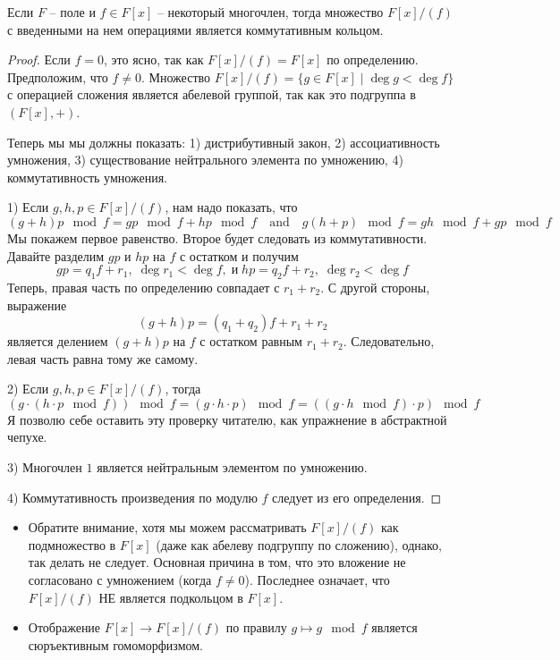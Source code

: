 \begin{claim}
Если $F$ -- поле и $f\in F[x]$ -- некоторый многочлен, тогда множество $F[x]/(f)$ с введенными на нем операциями является коммутативным кольцом.
\end{claim}
\begin{proof}
Если $f = 0$, это ясно, так как $F[x]/(f) = F[x]$ по определению.
Предположим, что $f \neq 0$.
Множество $F[x]/(f) = \{g\in F[x]\mid \deg g < \deg f\}$ с операцией сложения является абелевой группой, так как это подгруппа в $(F[x], +)$.

Теперь мы мы должны показать: 1) дистрибутивный закон, 2) ассоциативность умножения, 3) существование нейтрального элемента по умножению, 4) коммутативность умножения.

1) Если $g,h,p\in F[x]/(f)$, нам надо показать, что
\[
(g+h)p\!\!\mod{f} = gp\!\!\mod{f} + hp\!\!\mod{f}\quad\text{and}\quad
g(h+p)\!\!\mod{f} = gh\!\!\mod{f} + gp\!\!\mod{f}
\]
Мы покажем первое равенство.
Второе будет следовать из коммутативности.
Давайте разделим $gp$ и $hp$ на $f$ с остатком и получим
\[
gp = q_1 f + r_1,\;\deg r_1 < \deg f,\;\text{и}\;hp = q_2 f + r_2,\;\deg r_2 < \deg f
\]
Теперь, правая часть по определению совпадает с $r_1 + r_2$.
С другой стороны, выражение
\[
(g+h)p = (q_1 + q_2)f + r_1 + r_2
\]
является делением $(g+h)p$ на $f$ с остатком равным $r_1 + r_2$.
Следовательно, левая часть равна тому же самому.

2) Если $g,h,p\in F[x]/(f)$, тогда 
\[
(g\cdot  (h\cdot  p\!\!\mod{f}))\!\!\mod{f}= (g\cdot  h\cdot  p)\!\!\mod{f} = ((g \cdot h\!\!\mod{f}) \cdot p)\!\!\mod{f}
\]
Я позволю себе оставить эту проверку читателю, как упражнение в абстрактной чепухе.

3) Многочлен $1$ является нейтральным элементом по умножению.

4) Коммутативность произведения по модулю $f$ следует из его определения.
\end{proof}

\begin{remarks}
\begin{itemize}
\item Обратите внимание, хотя мы можем рассматривать  $F[x]/(f)$ как подмножество в $F[x]$ (даже как абелеву подгруппу по сложению), однако, так делать не следует.
Основная причина в том, что это вложение не согласовано с умножением (когда $f \neq 0$).
Последнее означает, что $F[x]/(f)$ НЕ является подкольцом в $F[x]$.

\item Отображение $F[x]\to F[x]/(f)$ по правилу $g\mapsto g\!\!\mod{f}$ является сюръективным гомоморфизмом.
\end{itemize}
\end{remarks}

